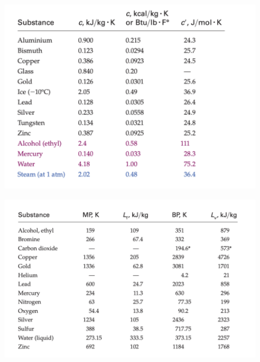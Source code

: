 \documentclass[12pt,a4paper]{article}
\begin{document}
	\begin{figure}[h!]
	\centering
	\includegraphics[width=0.7\linewidth]{latentHeat1}
	\caption{}
	\label{fig:latentheat2}
\end{figure}

\begin{figure}
	\centering
	\includegraphics[width=0.7\linewidth]{latentHeat2}
	\caption{}
	\label{fig:latentheat2}
\end{figure}
\end{document}
